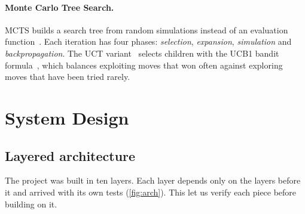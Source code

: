 \documentclass[11pt,a4paper]{article}
\begin{document}
\paragraph{Monte Carlo Tree Search.} MCTS builds a search tree from random simulations instead of an evaluation function~\cite{browne2012}. Each iteration has four phases: \emph{selection}, \emph{expansion}, \emph{simulation} and \emph{backpropagation}. The UCT variant~\cite{kocsis2006} selects children with the UCB1 bandit formula~\cite{auer2002}, which balances exploiting moves that won often against exploring moves that have been tried rarely.

\clearpage
\section{System Design}\label{sec:design}

\subsection{Layered architecture}
The project was built in ten layers. Each layer depends only on the layers before it and arrived with its own tests (\cref{fig:arch}). This let us verify each piece before building on it.
\end{document}
